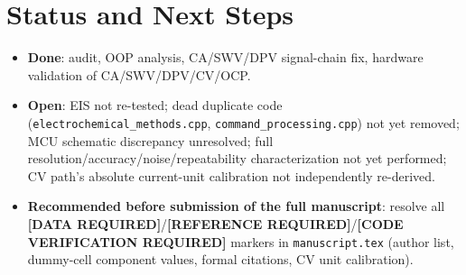 \documentclass[journal]{IEEEtran}
\begin{document}
\section{Status and Next Steps}
\begin{itemize}
\item \textbf{Done}: audit, OOP analysis, CA/SWV/DPV signal-chain fix, hardware validation of CA/SWV/DPV/CV/OCP.
\item \textbf{Open}: EIS not re-tested; dead duplicate code (\texttt{electrochemical\_methods.cpp}, \texttt{command\_processing.cpp}) not yet removed; MCU schematic discrepancy unresolved; full resolution/accuracy/noise/repeatability characterization not yet performed; CV path's absolute current-unit calibration not independently re-derived.
\item \textbf{Recommended before submission of the full manuscript}: resolve all \textbf{[DATA REQUIRED]}/\textbf{[REFERENCE REQUIRED]}/\textbf{[CODE VERIFICATION REQUIRED]} markers in \texttt{manuscript.tex} (author list, dummy-cell component values, formal citations, CV unit calibration).
\end{itemize}
\end{document}
